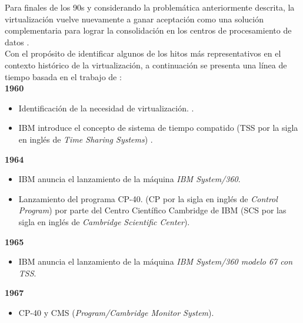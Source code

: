 Para finales de los 90s y considerando la problemática anteriormente descrita, la virtualización vuelve nuevamente a ganar  aceptación como una solución complementaria para lograr la consolidación en los centros de procesamiento de datos \parencite{Oludele2014, Sukmana2016}.\\

Con el propósito de identificar algunos de los hitos más representativos en el contexto histórico de la virtualización, a continuación se presenta una línea de tiempo basada en el trabajo de \textcite{Marshall2006}:\\
				
\textbf{1960}\\
\begin{itemize}
	\item Identificación de la necesidad de virtualización.  \parencite{Ameen2013}.\\
	\item IBM introduce el concepto de sistema de tiempo compatido (TSS por la sigla en inglés de \textit{Time Sharing Systems}) \parencite{Dittner2011}.\\
\end{itemize}				
				
\textbf{1964}\\
\begin{itemize}
	\item IBM anuncia el lanzamiento de la máquina \textit{IBM System/360}.\\
	
	\item Lanzamiento del programa CP-40. (CP por la sigla en inglés de \textit{Control Program}) por parte del Centro Científico Cambridge de IBM (SCS por las sigla en inglés de \textit{Cambridge Scientific Center}).\\
\end{itemize}

\textbf{1965}\\
\begin{itemize}
	\item IBM anuncia el lanzamiento de la máquina \textit{IBM System/360 modelo 67 con TSS}.\\
\end{itemize}

\textbf{1967}\\
\begin{itemize}
	\item CP-40 y CMS (\textit{Program/Cambridge Monitor System}).\\
\end{itemize}

